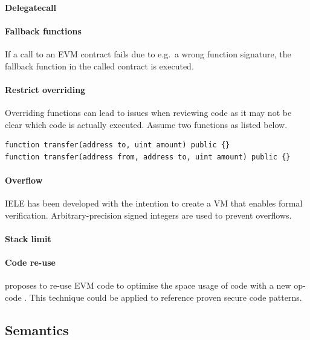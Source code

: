 \paragraph{Delegatecall}

\paragraph{Fallback functions}
If a call to an EVM contract fails due to e.g.\ a wrong function signature, the fallback function in the called contract is executed.

\paragraph{Restrict overriding}
Overriding functions can lead to issues when reviewing code as it may not be clear which code is actually executed. Assume two functions as listed below.
\begin{lstlisting}[caption={Function overriding with different inputs.},label=lst:tail-call,language=Solidity]
function transfer(address to, uint amount) public {}
function transfer(address from, address to, uint amount) public {}
\end{lstlisting}

\paragraph{Overflow}
IELE has been developed with the intention to create a VM that enables formal verification. Arbitrary-precision signed integers are used to prevent overflows.

\paragraph{Stack limit}


\paragraph{Code re-use}
\citeauthor{Pontiveros2018} proposes to re-use EVM code to optimise the space usage of code with a new op-code \cite{Pontiveros2018}. This technique could be applied to reference proven secure code patterns.

\subsection{Semantics}

